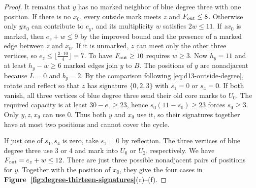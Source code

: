 \documentclass[preprint,11pt,numbers]{elsarticle-arxiv}
\numberwithin{equation}{section}
\theoremstyle{definition}
\begin{document}
\begin{proof}
It remains that $y$ has no marked neighbor of blue degree three
with one position. If there is no $x_0$, every outside mark meets
$z$ and $F_{\rm out}\le8$. Otherwise only $yx_0$ can contribute
to $e_y$, and its multiplicity $w$ satisfies $2w\le11$. If $zx_0$
is marked, then $e_z+w\le9$ by the improved bound and the presence
of a marked edge between $z$ and $x_0$. If it is unmarked,
$z$ can meet only the other three vertices,
so $e_z\le\lfloor\frac{3\cdot10}{4}\rfloor=7$. To have $F_{\rm out}\ge10$
requires $w\ge3$. Now $h_y=11$ and at least $h_y-w\ge6$ marked
edges join $y$ to $B$.
The positions of $y$ are nonadjacent because $L=0$ and $b_y=2$.
By the comparison following \eqref{eq:d13-outside-degree}, rotate
and reflect so that $z$ has signature $\{0,2,3\}$ with
$s_1=0$ or $s_4=0$. If both vanish, all three vertices of blue
degree three send their old core marks to $U_0$. The required
capacity is at least $30-e_z\ge23$, hence $s_0(11-s_0)\ge23$
forces $s_0\ge3$. Only $y,z,x_0$ can use 0. Thus both $y$ and
$x_0$ use it, so their signatures together have at most two positions
and cannot cover the cycle.

If just one of $s_1,s_4$ is zero, take $s_1=0$ by reflection.
The three vertices of blue degree three use 3 or 4 and mark into
$U_0$ or $U_2$, respectively. We have $F_{\rm out}=e_z+w\le12$.
There are just three possible nonadjacent pairs of positions for $y$.
Together with the position of $x_0$, they give the four cases in
\textbf{Figure~\ref{fig:degree-thirteen-signatures}}(c)--(f).


\end{proof}
\end{document}

